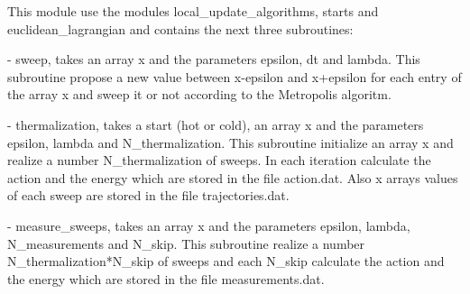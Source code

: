 This module use the modules local_update_algorithms, starts and euclidean_lagrangian and contains the next three subroutines:

- sweep, takes an array x and the parameters epsilon, dt and lambda. This subroutine propose a new value between x-epsilon and x+epsilon for each entry of the array x and sweep it or not according to the Metropolis algoritm.

- thermalization, takes a start (hot or cold), an array x and the parameters epsilon, lambda and N_thermalization. This subroutine initialize an array x and realize a number N_thermalization of sweeps. In each iteration calculate the action and the energy which are stored in the file action.dat. Also x arrays values of each sweep are stored in the file trajectories.dat.

- measure_sweeps, takes an array x and the parameters epsilon, lambda, N_measurements and N_skip. This subroutine realize a number N_thermalization*N_skip of sweeps and each N_skip calculate the action and the energy which are stored in the file measurements.dat.